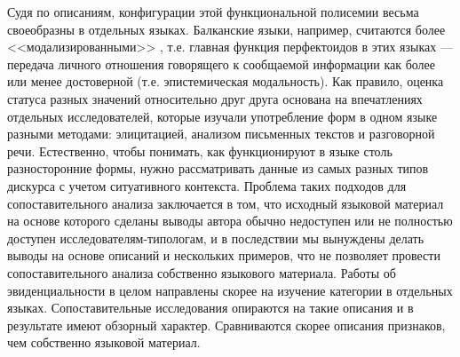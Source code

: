 \par Судя по описаниям, конфигурации этой функциональной полисемии весьма своеобразны в отдельных языках. Балканские языки, например, считаются более <<модализированными>> \citep[354]{plungian2001}, т.е. главная функция перфектоидов в этих языках --- передача личного отношения говорящего к сообщаемой информации как более или менее достоверной (т.е. эпистемическая модальность). Как правило, оценка статуса разных значений относительно друг друга основана на впечатлениях отдельных исследователей, которые изучали употребление форм в одном языке разными методами: элицитацией, анализом письменных текстов и разговорной речи. Естественно, чтобы понимать, как функционируют в языке столь разносторонние формы, нужно рассматривать данные из самых разных типов дискурса с учетом ситуативного контекста. Проблема таких подходов для сопоставительного анализа заключается в том, что исходный языковой материал на основе которого сделаны выводы автора обычно недоступен или не полностью доступен исследователям-типологам, и в последствии мы вынуждены делать выводы на основе описаний и нескольких примеров, что не позволяет провести сопоставительного анализа собственно языкового материала. Работы об эвиденциальности в целом направлены скорее на изучение категории в отдельных языках. Сопоставительные исследования опираются на такие описания и в результате имеют обзорный характер. Сравниваются скорее описания признаков, чем собственно языковой материал.
